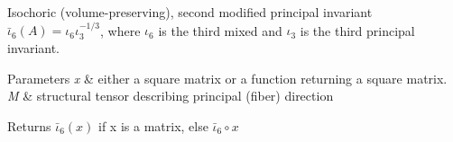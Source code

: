 Isochoric (volume-\/preserving), second modified principal invariant $ \bar\iota_6(A)=\iota_6\iota_3^{-1/3} $, where $\iota_6$ is the third mixed and $\iota_3$ is the third principal invariant. 


\begin{DoxyParams}{Parameters}
{\em x} & either a square matrix or a function returning a square matrix. \\
\hline
{\em M} & structural tensor describing principal (fiber) direction \\
\hline
\end{DoxyParams}
\begin{DoxyReturn}{Returns}
$\bar\iota_6(x)$ if x is a matrix, else $\bar\iota_6 \circ x$ 
\end{DoxyReturn}
